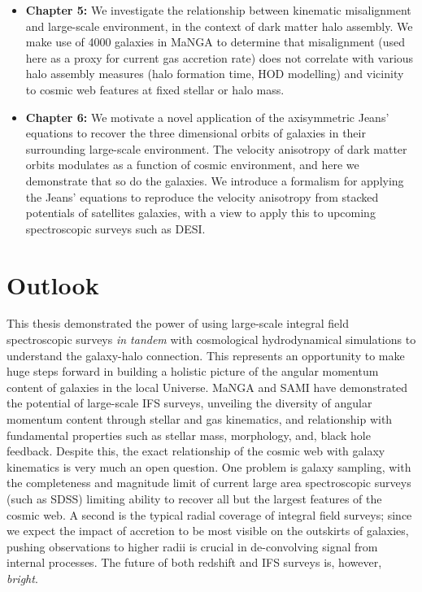 \begin{itemize}
    \item \textbf{Chapter 5:} We investigate the relationship between kinematic misalignment and large-scale environment, in the context of dark matter halo assembly. We make use of 4000 galaxies in MaNGA to determine that misalignment (used here as a proxy for current gas accretion rate) does not correlate with various halo assembly measures (halo formation time, HOD modelling) and vicinity to cosmic web features at fixed stellar or halo mass. 
    
    \item \textbf{Chapter 6:} We motivate a novel application of the axisymmetric Jeans' equations to recover the three dimensional orbits of galaxies in their surrounding large-scale environment. The velocity anisotropy of dark matter orbits modulates as a function of cosmic environment, and here we demonstrate that so do the galaxies. We introduce a formalism for applying the Jeans' equations to reproduce the velocity anisotropy from stacked potentials of satellites galaxies, with a view to apply this to upcoming spectroscopic surveys such as DESI.
\end{itemize}

\section{Outlook}
This thesis demonstrated the power of using large-scale integral field spectroscopic surveys \textit{in tandem} with cosmological hydrodynamical simulations to understand the galaxy-halo connection. This represents an opportunity to make huge steps forward in building a holistic picture of the angular momentum content of galaxies in the local Universe. MaNGA and SAMI have demonstrated the potential of large-scale IFS surveys, unveiling the diversity of angular momentum content through stellar and gas kinematics, and relationship with fundamental properties such as stellar mass, morphology, and, black hole feedback. Despite this, the exact relationship of the cosmic web with galaxy kinematics is very much an open question. One problem is galaxy sampling, with the completeness and magnitude limit of current large area spectroscopic surveys (such as SDSS) limiting ability to recover all but the largest features of the cosmic web. A second is the typical radial coverage of integral field surveys; since we expect the impact of accretion to be most visible on the outskirts of galaxies, pushing observations to higher radii is crucial in de-convolving signal from internal processes. The future of both redshift and IFS surveys is, however, \textit{bright}. 

